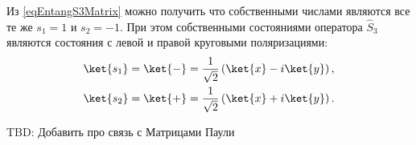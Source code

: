 
Из \eqref{eqEntangS3Matrix} можно получить что собственными числами
являются все те же $s_1 = 1$ и $s_2 = -1$. При этом собственными
состояниями оператора $\hat{S}_3$ являются состояния с левой и правой
круговыми поляризациями:
\begin{eqnarray}
  \ket{ s_1 } = \ket{ - } = \frac{1}{\sqrt{2}}
  \left(
  \ket{x} - i \ket{y}
  \right),
  \nonumber \\
  \ket{ s_2 } = \ket{ + } = \frac{1}{\sqrt{2}}
  \left(
  \ket{x} + i \ket{y}
  \right).
  \label{eqEntangS3Eigenvec}
\end{eqnarray}

TBD: Добавить про связь с Матрицами Паули





